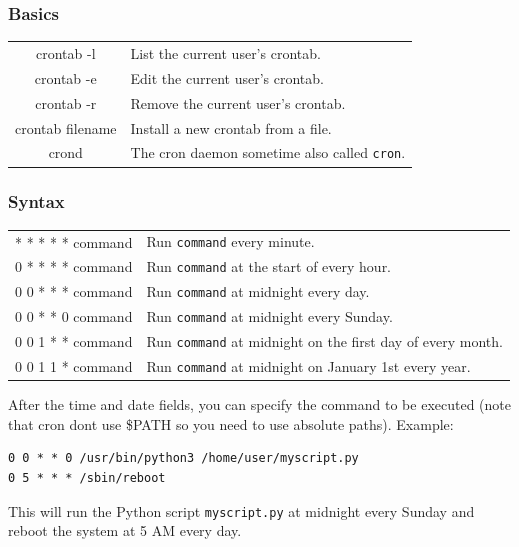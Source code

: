 \documentclass[10pt]{article}
\begin{document}
\begin{multicols}{2}
\subsubsection{Basics}
\begin{tabular}{C L}
    crontab -l        & List the current user's crontab. \\
    crontab -e        & Edit the current user's crontab. \\
    crontab -r        & Remove the current user's crontab. \\
    crontab filename  & Install a new crontab from a file. \\
    crond            & The cron daemon sometime also called \texttt{cron}. \\
\end{tabular}

\subsubsection{Syntax}
\begin{tabular}{C L}
    * * * * * command & Run \texttt{command} every minute. \\
    0 * * * * command & Run \texttt{command} at the start of every hour. \\
    0 0 * * * command & Run \texttt{command} at midnight every day. \\
    0 0 * * 0 command & Run \texttt{command} at midnight every Sunday. \\
    0 0 1 * * command & Run \texttt{command} at midnight on the first day of every month. \\
    0 0 1 1 * command & Run \texttt{command} at midnight on January 1st every year. \\
\end{tabular}
After the time and date fields, you can specify the command to be executed (note that cron dont use \$PATH so you need to use absolute paths). Example:
\begin{verbatim}
0 0 * * 0 /usr/bin/python3 /home/user/myscript.py
0 5 * * * /sbin/reboot
\end{verbatim}
This will run the Python script \texttt{myscript.py} at midnight every Sunday and reboot the system at 5 AM every day.


\end{multicols}
\end{document}
